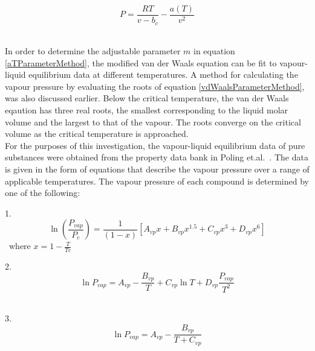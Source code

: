 \begin{equation}
P  = \dfrac{RT}{v - b_{c}} - \dfrac{a\left(T\right)}{v^{2}} \label{vdWaalsModifiedMethod}
\end{equation}\

In order to determine the adjustable parameter $m$ in equation \ref{aTParameterMethod}, the modified van der Waals equation can be fit to vapour-liquid equilibrium data at different temperatures. A method for calculating the vapour pressure by evaluating the roots of equation \ref{vdWaalsParameterMethod}, was also discussed earlier. Below the critical temperature, the van der Waals eqaution has three real roots, the smallest corresponding to the liquid molar volume and the largest to that of the vapour. The roots converge on the critical volume as the critical temperature is approached.\\

For the purposes of this investigation, the vapour-liquid equilibrium data of pure substances were obtained from the property data bank in Poling et.al.~\cite{GasLiquidProperties}. The data is given in the form of equations that describe the vapour pressure over a range of applicable temperatures. The vapour pressure of each compound is determined by one of the following:\

\begin{list}{method}{}
\item 1. \begin{equation}
\ln \left(\frac{P_{vap}}{P_{c}}\right) = \frac{1}{\left(1-x\right)}\left[A_{vp}x + B_{vp}x^{1.5} + C_{vp}x^{3} + D_{vp}x^{6}\right] \label{Method1}
\end{equation}\
where $x = 1 - \frac{T}{Tc}$\
\item 2. \begin{equation}
\ln P_{vap} = A_{vp} - \frac{B_{vp}}{T} + C_{vp}\ln T + D_{vp} \frac{P_{vap}}{T^{2}} \label{Method2}
\end{equation}\
\item 3. \begin{equation}
\ln P_{vap} = A_{vp} - \frac{B_{vp}}{T + C_{vp}} \label{Method3}
\end{equation}\
\end{list}\
				
\nomenclature{$P_{vap}$}{Vapour pressure of a pure compound $[bar]$}
		
